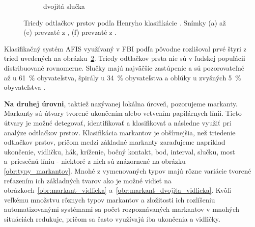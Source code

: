 \begin{figure}[h]
\begin{subfigure}[b]{0.19\linewidth}
      \caption{dvojitá slučka}
      \label{obr:triedy_odtlackov/dvojita_slucka}
    \end{subfigure}
    \caption{Triedy odtlačkov prstov podľa Henryho klasifikácie \cite{Henry}. Snímky (a) až (e) prevzaté z \cite{Handbook}, (f) prevzaté z \cite{Drahansky}.}
    \label{obr:triedy_odtlackov}
  \end{figure}
  Klasifikačný systém AFIS využívaný v FBI podľa \cite{FingerprintSrcBook} pôvodne rozlišoval prvé štyri z tried uvedených na obrázku~{\ref{obr:triedy_odtlackov}}.
  Triedy odtlačkov prsta nie sú v ľudskej populácii distribuované rovnomerne.
  Slučky majú najväčšie zastúpenie a sú pozorovateľné až u 61~\% obyvateľstva, špirály u 34~\% obyvateľstva a oblúky u zvyšných
  5~\% obyvateľstva \cite{sciencing}.

  \textbf{Na druhej úrovni}, taktiež nazývanej lokálna úroveň, pozorujeme markanty. Markanty sú útvary tvorené ukončením alebo
  vetvením papilárnych línií. Tieto útvary je možné detegovať, identifikovať a klasifikovať a následne využiť pri analýze odtlačkov prstov.
  Klasifikácia markantov je obšírnejšia, než triedenie odtlačkov prstov, pričom medzi základné markanty zaraďujeme napríklad
  ukončenie, vidličku, hák, kríženie, bočný kontakt, bod, interval, slučku, most a~priesečnú líniu \cite{Drahansky} - niektoré z nich sú znázornené na obrázku
  \ref{obr:typy_markantov}. Mnohé z vymenovaných typov majú rôzne
  variácie tvorené reťazením ich základných tvarov ako je možné vidieť na obrázkoch~{\ref{obr:markant_vidlicka}} a~{\ref{obr:markant_dvojita_vidlicka}}.
  Kvôli veľkému množstvu rôznych typov markantov a zložitosti ich rozlíšeniu automatizovanými systémami sa počet rozpoznávaných markantov v mnohých
  situáciách redukuje, pričom sa často využívajú iba ukončenia a vidličky.

